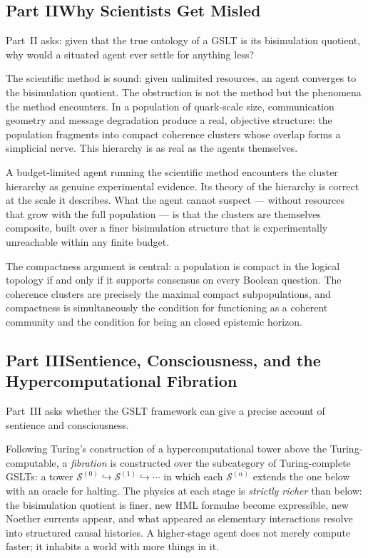 \documentclass[12pt,openright,twoside]{book}
\theoremstyle{remark}
\theoremstyle{plain}
\theoremstyle{remark}
\theoremstyle{plain}
\theoremstyle{plain}
\newcommand{\GSLT}{\mathcal{S}}
\newcommand{\fiber}[1]{\GSLT^{(#1)}}
\begin{document}
\bigskip

\subsection*{Part II\quad Why Scientists Get Misled}

Part~II asks: given that the true ontology of a GSLT is its
bisimulation quotient, why would a situated agent ever settle
for anything less?

The scientific method is sound: given unlimited resources, an
agent converges to the bisimulation quotient.
The obstruction is not the method but the phenomena the method
encounters.
In a population of quark-scale size, communication geometry and
message degradation produce a real, objective structure: the
population fragments into compact coherence clusters whose overlap
forms a simplicial nerve.
This hierarchy is as real as the agents themselves.

A budget-limited agent running the scientific method encounters
the cluster hierarchy as genuine experimental evidence.
Its theory of the hierarchy is correct at the scale it describes.
What the agent cannot suspect --- without resources that grow with
the full population --- is that the clusters are themselves
composite, built over a finer bisimulation structure that is
experimentally unreachable within any finite budget.

The compactness argument is central: a population is compact in
the logical topology if and only if it supports consensus on every
Boolean question.
The coherence clusters are precisely the maximal compact
subpopulations, and compactness is simultaneously the condition
for functioning as a coherent community and the condition for
being an closed epistemic horizon.

\bigskip

\subsection*{Part III\quad Sentience, Consciousness, and the
Hypercomputational Fibration}

Part~III asks whether the GSLT framework can give a precise account
of sentience and consciousness.

Following Turing's construction of a hypercomputational tower above
the Turing-computable, a \emph{fibration} is constructed over the
subcategory of Turing-complete GSLTs: a tower
$\fiber{0} \hookrightarrow \fiber{1} \hookrightarrow \cdots$
in which each $\fiber{\alpha}$ extends the one below with an oracle
for halting.
The physics at each stage is \emph{strictly richer} than below:
the bisimulation quotient is finer, new HML formulae become
expressible, new Noether currents appear, and what appeared as
elementary interactions resolve into structured causal histories.
A higher-stage agent does not merely compute faster; it inhabits
a world with more things in it.
\end{document}
